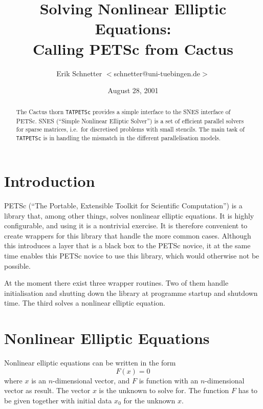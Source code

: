 \documentclass[12pt]{article}
\begin{document}
\title{Solving Nonlinear Elliptic Equations:\\ Calling PETSc from
  Cactus}

\author{Erik Schnetter $<$schnetter@uni-tuebingen.de$>$}

\date{August 28, 2001}

\maketitle

\begin{abstract}
  The Cactus thorn \texttt{TATPETSc} provides a simple interface to
  the SNES interface of PETSc.  SNES (``Simple Nonlinear Elliptic
  Solver'') is a set of efficient parallel solvers for sparse
  matrices, i.e.\ for discretised problems with small stencils.  The
  main task of \texttt{TATPETSc} is in handling the mismatch in the
  different parallelisation models.
\end{abstract}

\tableofcontents

\section{Introduction}

PETSc (``The Portable, Extensible Toolkit for Scientific
Computation'') \cite{TAT_TATPETSc_petsc} is a library that, among
other things, solves nonlinear elliptic equations.  It is highly
configurable, and using it is a nontrivial exercise.  It is therefore
convenient to create wrappers for this library that handle the more
common cases.  Although this introduces a layer that is a black box to
the PETSc novice, it at the same time enables this PETSc novice to use
this library, which would otherwise not be possible.

At the moment there exist three wrapper routines.  Two of them handle
initialisation and shutting down the library at programme startup and
shutdown time.  The third solves a nonlinear elliptic equation.

\section{Nonlinear Elliptic Equations}

Nonlinear elliptic equations can be written in the form
$$
F(x) = 0
$$
where $x$ is an $n$-dimensional vector, and $F$ is function with an
$n$-dimensional vector as result.  The vector $x$ is the unknown to
solve for.  The function $F$ has to be given together with initial
data $x_0$ for the unknown $x$.
\end{document}
